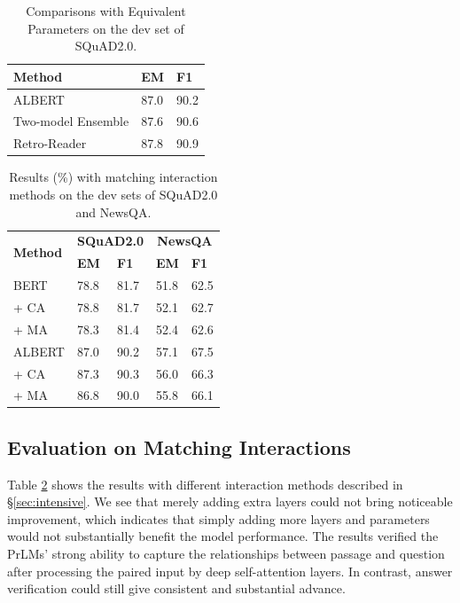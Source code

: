 \documentclass[letterpaper]{article} %
\begin{document}
\begin{table}
\begin{center}
\setlength{\tabcolsep}{13.5pt}
{
\begin{tabular}{lll}
\toprule
\textbf{Method}	& \textbf{EM} & \textbf{F1} \\
\midrule
ALBERT & 87.0 & 90.2  \\
Two-model Ensemble & 87.6  &  90.6    \\
Retro-Reader  &  87.8 & 90.9  \\
\bottomrule
\end{tabular}
}
\end{center}
\vspace{-1.07mm}
\vspace{-2.14mm}
\caption{\label{tableequ} Comparisons with Equivalent Parameters on the dev set of SQuAD2.0.}
\end{table}

\begin{table}
\begin{center}
\setlength{\tabcolsep}{10pt}
{
\begin{tabular}{lllll}
\toprule
\multirow{2}{*}{\textbf{Method}} & \multicolumn{2}{c}{\textbf{SQuAD2.0}} & \multicolumn{2}{c}{\textbf{NewsQA}} \\
& \textbf{EM} & \textbf{F1} & \textbf{EM} & \textbf{F1} \\
\midrule
BERT &  78.8 & 81.7 & 51.8 & 62.5 \\
\quad     + CA &  78.8 & 81.7 & 52.1 & 62.7\\
\quad     + MA  &  78.3  & 81.4  & 52.4 & 62.6 \\
\midrule
ALBERT & 87.0 & 90.2 & 57.1 & 67.5\\
\quad     + CA & 87.3 & 90.3  & 56.0 & 66.3  \\
\quad     + MA  & 86.8 & 90.0  & 55.8 & 66.1  \\
\bottomrule
\end{tabular}
}
\end{center}
\caption{\label{tableatt} Results (\%) with matching interaction methods on the dev sets of SQuAD2.0 and NewsQA.}
\end{table}
\subsection{Evaluation on Matching Interactions}
Table \ref{tableatt} shows the results with different interaction methods described in \S\ref{sec:intensive}.
We see that merely adding extra layers could not bring noticeable improvement, which indicates that simply adding more layers and parameters would not substantially benefit the model performance. The results verified the PrLMs' strong ability to capture the relationships between passage and question after processing the paired input by deep self-attention layers. In contrast, answer verification could still give consistent and substantial advance.
\end{document}
